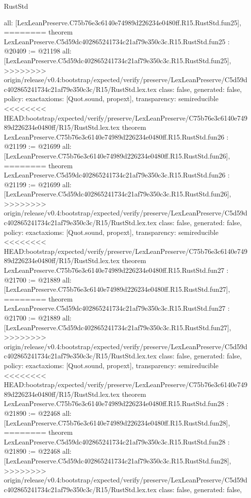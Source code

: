 \begin{lexlean}{RustStd}
\begin{coremodule}
{\begin{coremodule}
{{{{{{{{{{{{{{{{{{{{{{{{{{{{  all: [LexLeanPreserve.C75b76e3c6140e74989d226234e0480ff.R15.RustStd.fun25],
========
theorem LexLeanPreserve.C5d59dc402865241734c21af79e350c3c.R15.RustStd.fun25 : @20409 := @21198 {
  all: [LexLeanPreserve.C5d59dc402865241734c21af79e350c3c.R15.RustStd.fun25],
>>>>>>>> origin/release/v0.4:bootstrap/expected/verify/preserve/LexLeanPreserve/C5d59dc402865241734c21af79e350c3c/R15/RustStd.lex.tex
  class: false,
  generated: false,
  policy: exact{axioms: [Quot.sound, propext]},
  transparency: semireducible
}
<<<<<<<< HEAD:bootstrap/expected/verify/preserve/LexLeanPreserve/C75b76e3c6140e74989d226234e0480ff/R15/RustStd.lex.tex
theorem LexLeanPreserve.C75b76e3c6140e74989d226234e0480ff.R15.RustStd.fun26 : @21199 := @21699 {
  all: [LexLeanPreserve.C75b76e3c6140e74989d226234e0480ff.R15.RustStd.fun26],
========
theorem LexLeanPreserve.C5d59dc402865241734c21af79e350c3c.R15.RustStd.fun26 : @21199 := @21699 {
  all: [LexLeanPreserve.C5d59dc402865241734c21af79e350c3c.R15.RustStd.fun26],
>>>>>>>> origin/release/v0.4:bootstrap/expected/verify/preserve/LexLeanPreserve/C5d59dc402865241734c21af79e350c3c/R15/RustStd.lex.tex
  class: false,
  generated: false,
  policy: exact{axioms: [Quot.sound, propext]},
  transparency: semireducible
}
<<<<<<<< HEAD:bootstrap/expected/verify/preserve/LexLeanPreserve/C75b76e3c6140e74989d226234e0480ff/R15/RustStd.lex.tex
theorem LexLeanPreserve.C75b76e3c6140e74989d226234e0480ff.R15.RustStd.fun27 : @21700 := @21889 {
  all: [LexLeanPreserve.C75b76e3c6140e74989d226234e0480ff.R15.RustStd.fun27],
========
theorem LexLeanPreserve.C5d59dc402865241734c21af79e350c3c.R15.RustStd.fun27 : @21700 := @21889 {
  all: [LexLeanPreserve.C5d59dc402865241734c21af79e350c3c.R15.RustStd.fun27],
>>>>>>>> origin/release/v0.4:bootstrap/expected/verify/preserve/LexLeanPreserve/C5d59dc402865241734c21af79e350c3c/R15/RustStd.lex.tex
  class: false,
  generated: false,
  policy: exact{axioms: [Quot.sound, propext]},
  transparency: semireducible
}
<<<<<<<< HEAD:bootstrap/expected/verify/preserve/LexLeanPreserve/C75b76e3c6140e74989d226234e0480ff/R15/RustStd.lex.tex
theorem LexLeanPreserve.C75b76e3c6140e74989d226234e0480ff.R15.RustStd.fun28 : @21890 := @22468 {
  all: [LexLeanPreserve.C75b76e3c6140e74989d226234e0480ff.R15.RustStd.fun28],
========
theorem LexLeanPreserve.C5d59dc402865241734c21af79e350c3c.R15.RustStd.fun28 : @21890 := @22468 {
  all: [LexLeanPreserve.C5d59dc402865241734c21af79e350c3c.R15.RustStd.fun28],
>>>>>>>> origin/release/v0.4:bootstrap/expected/verify/preserve/LexLeanPreserve/C5d59dc402865241734c21af79e350c3c/R15/RustStd.lex.tex
  class: false,
  generated: false,
}}}}}}}}}}}}}}}}}}}}}}}}}}}}}}}}
\end{coremodule}}
\end{coremodule}
\end{lexlean}
